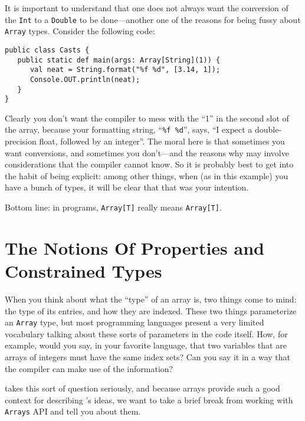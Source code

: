 It is important to understand that one does not always want the conversion of
the {\tt Int} to a {\tt Double} to be done---another one of the reasons for
\Xten{} being
fussy about {\tt Array} types.  Consider the following code:
\begin{verbatim}
public class Casts {
   public static def main(args: Array[String](1)) {
      val neat = String.format("%f %d", [3.14, 1]);
      Console.OUT.println(neat);
   }
}\end{verbatim}
Clearly you don't want the compiler to mess with the ``1'' in the
second slot of the array,
because your formatting string, ``{\tt \%f \%d}'', says, ``I expect a
double-precision float, followed by an integer''. The moral here is
that sometimes you want
conversions, and sometimes you don't---and the reasons why
may involve considerations that the compiler cannot know.
So it is probably best to get into the habit of being explicit: among other
things, when (as in this example) you have a bunch of types, it will be
clear that that was your intention.

Bottom line: in \Xten{} programs, {\tt Array[T]} really means {\tt Array[T]}.

\section{The Notions Of Properties and Constrained Types}\label{sub:tnpct}

When you think about what the ``type'' of an array is, two things come
to mind: the type of its entries, and how they are indexed.  These two things
parameterize an {\tt Array} type, but most programming languages present a
very limited vocabulary talking about these sorts of parameters in the code itself.   
How, for example, would you say, in your favorite language, that two variables
that are arrays of integers must have the same index sets?  Can you say
it in a way that the compiler can make use of the information? 

\Xten{} takes
this sort of question seriously, and because arrays provide such a good
context for describing \Xten's ideas, we want to take a brief break from
working with {\tt Arrays} API and tell you about them.

